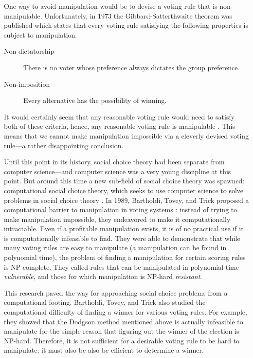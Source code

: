 	One way to avoid manipulation would be to devise a voting rule that is non-manipulable. Unfortunately, in 1973 the Gibbard-Satterthwaite theorem was published which states that every voting rule satisfying the following properties is subject to manipulation.
	\begin{description}
		\item[Non-dictatorship] There is no voter whose preference always dictates the group preference.
		\item[Non-imposition] Every alternative has the possibility of winning.
	\end{description}
	It would certainly seem that any reasonable voting rule would need to satisfy both of these criteria, hence, any reasonable voting rule is manipulable \cite{gibbard1973manipulation, satterthwaite1975strategy, duggan2000strategic}. This means that we cannot make manipulation impossible via a cleverly devised voting rule---a rather disappointing conclusion.

	Until this point in its history, social choice theory had been separate from computer science---and computer science was a very young discipline at this point. But around this time a new sub-field of social choice theory was spawned: computational social choice theory, which seeks to use computer science to solve problems in social choice theory \cite{chevaleyre2007short}. In 1989, Bartholdi, Tovey, and Trick proposed a computational barrier to manipulation in voting systems \cite{bartholdi1989computational}: instead of trying to make manipulation impossible, they endeavored to make it computationally intractable. Even if a profitable manipulation exists, it is of no practical use  if it is computationally infeasible to find. They were able to demonstrate that while many voting rules are easy to manipulate (a manipulation can be found in polynomial time), the problem of finding a manipulation for certain scoring rules is NP-complete. They called rules that can be manipulated in polynomial time \emph{vulnerable}, and those for which manipulation is NP-hard \emph{resistant}.

	This research paved the way for approaching social choice problems from a computational footing. Bartholdi, Tovey, and Trick also studied the computational difficulty of finding a winner for various voting rules. For example, they showed that the Dodgson method mentioned above \cite{dodgson1876method} is actually infeasible to manipulate for the simple reason that figuring out the winner of the election is NP-hard. Therefore, it is not sufficient for a desirable voting rule to be hard to manipulate; it must also be also be efficient to determine a winner.

